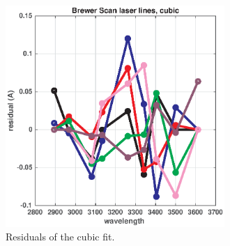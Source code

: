 \documentclass[acp, manuscript]{copernicus}
\begin{document}
\clearpage
\begin{figure}[t]
\includegraphics[width=8.3cm]{figures/General_brewer_scan_cubic_residual.eps}
\caption{ Residuals of the cubic fit.}
\label{fig:dsp_residual_cubic}
\end{figure}











\end{document}
